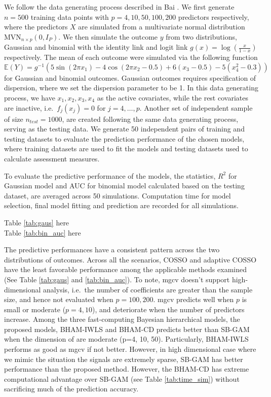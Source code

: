 \documentclass[AMA,STIX1COL,]{WileyNJD-v2}
\begin{document}
We follow the data generating process described in Bai \citep{Bai2021}.
We first generate \(n=500\) training data points with
\(p=4, 10, 50, 100, 200\) predictors respectively, where the predictors
\(X\) are simulated from a multivariate normal distribution
\(\text{MVN}_{n\times p}(0, I_{P})\). We then simulate the outcome \(y\)
from two distributions, Gaussian and binomial with the identity link and
logit link \(g(x) = \log(\frac{x}{1-x})\) respectively. The mean of each
outcome were simulated via the following function \[
\mathbb{E}(Y) = g^{-1}(5 \sin(2\pi x_1) - 4 \cos(2\pi x_2 -0.5) + 6(x_3-0.5) - 5(x_4^2 -0.3))
\] for Gaussian and binomial outcomes. Gaussian outcomes requires
specification of dispersion, where we set the dispersion parameter to be
1. In this data generating process, we have \(x_1, x_2, x_3, x_4\) as
the active covariates, while the rest covariates are inactive,
i.e.~\(f_j(x_j) = 0\) for \(j = 4, \dots, p\). Another set of
independent sample of size \(n_{test}=1000\), are created following the
same data generating process, serving as the testing data. We generate
50 independent pairs of training and testing datasets to evaluate the
prediction performance of the chosen models, where training datasets are
used to fit the models and testing datasets used to calculate assessment
measures.

To evaluate the predictive performance of the models, the statistics,
\(R^2\) for Gaussian model and AUC for binomial model calculated based
on the testing dataset, are averaged across 50 simulations. Computation
time for model selection, final model fitting and prediction are
recorded for all simulations.

\begin{center}
Table \ref{tab:gaus} here\\
Table \ref{tab:bin_auc} here\\
\end{center}

The predictive performances have a consistent pattern across the two
distributions of outcomes. Across all the scenarios, COSSO and adaptive
COSSO have the least favorable performance among the applicable methods
examined (See Table \ref{tab:gaus} and \ref{tab:bin_auc}). To note, mgcv
doesn't support high-dimensional analysis, i.e.~the number of
coefficients are greater than the sample size, and hence not evaluated
when \(p=100, 200\). mgcv predicts well when \(p\) is small or moderate
(\(p = 4, 10\)), and deteriorate when the number of predictors increase.
Among the three fast-computing Bayesian hierarchical models, the
proposed models, BHAM-IWLS and BHAM-CD predicts better than SB-GAM when
the dimension of are moderate (p=4, 10, 50). Particularly, BHAM-IWLS
performs as good as mgcv if not better. However, in high dimensional
case where we mimic the situation the signals are extremely sparse,
SB-GAM has better performance than the proposed method. However, the
BHAM-CD has extreme computational advantage over SB-GAM (see Table
\ref{tab:time_sim}) without sacrificing much of the prediction accuracy.
\end{document}
